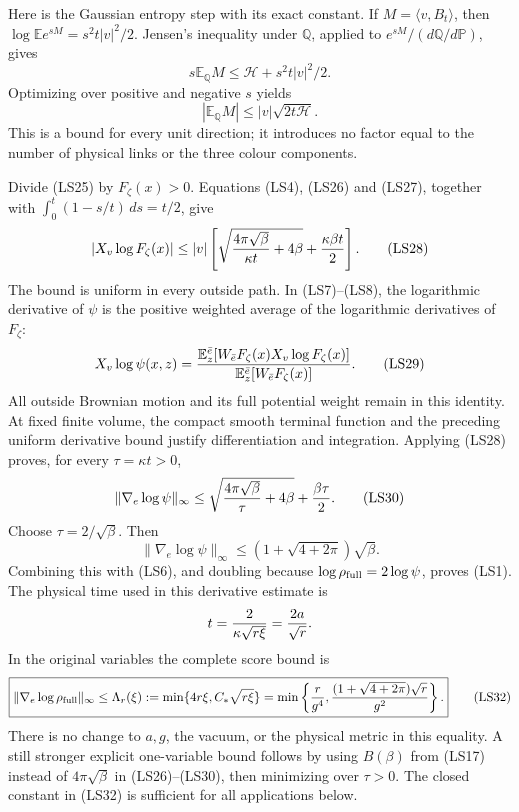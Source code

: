 \documentclass[11pt]{article}
\begin{document}
Here is the Gaussian entropy step with its exact constant.
If \(M=\langle v,B_t\rangle\), then
\(\log\mathbb E e^{sM}=s^2t|v|^2/2\). Jensen's inequality
under \(\mathbb Q\), applied to
\(e^{sM}/(d\mathbb Q/d\mathbb P)\), gives
\[
 s\mathbb E_{\mathbb Q}M
                  \le\mathcal H+s^2t|v|^2/2.
 \]
Optimizing over positive and negative \(s\) yields
\[
 |\mathbb E_{\mathbb Q}M|
                         \le |v|\sqrt{2t\mathcal H}.
 \tag{LS27}
\]
This is a bound for every unit direction; it introduces no factor
equal to the number of physical links or the three colour
components.

Divide (LS25) by \(F_\zeta(x)>0\). Equations (LS4), (LS26)
and (LS27), together with
\(\int_0^t(1-s/t)\,ds=t/2\), give
\[
 |X_v\log F_\zeta(x)|
 \le |v|\left[
 \sqrt{{4\pi\sqrt\beta\over\kappa t}+4\beta}
                                  +{\kappa\beta t\over2}\right].
 \tag{LS28}
\]
The bound is uniform in every outside path. In (LS7)–(LS8),
the logarithmic derivative of \(\psi\) is the positive weighted
average of the logarithmic derivatives of \(F_\zeta\):
\[
 X_v\log\psi(x,z)
 ={\mathbb E_z^{\bar e}
       [W_{\bar e}F_\zeta(x)X_v\log F_\zeta(x)]
        \over
        \mathbb E_z^{\bar e}[W_{\bar e}F_\zeta(x)]}.
 \tag{LS29}
\]
All outside Brownian motion and its full potential weight remain
in this identity. At fixed finite volume, the compact smooth
terminal function and the preceding uniform derivative bound
justify differentiation and integration. Applying (LS28) proves,
for every \(\tau=\kappa t>0\),
\[
 \|\nabla_e\log\psi\|_\infty
 \le\sqrt{{4\pi\sqrt\beta\over\tau}+4\beta}+{\beta\tau\over2}.
 \tag{LS30}
\]
Choose \(\tau=2/\sqrt\beta\). Then
\[
 \boxed{\|\nabla_e\log\psi\|_\infty
       \le(1+\sqrt{4+2\pi})\sqrt\beta.}
 \tag{LS31}
\]
Combining this with (LS6), and doubling because
\(\log\rho_{\rm full}=2\log\psi\), proves (LS1).
The physical time used in this derivative estimate is
\[
 t={2\over\kappa\sqrt{r\xi}}={2a\over\sqrt r}.
 \]
In the original variables the complete score bound is
\[
 \boxed{\|\nabla_e\log\rho_{\rm full}\|_\infty
 \le\Lambda_r(\xi):=\min\{4r\xi,C_*\sqrt{r\xi}\}
 =\min\left\{{r\over g^4},
                  {(1+\sqrt{4+2\pi})\sqrt r\over g^2}\right\}.}
 \tag{LS32}
\]
There is no change to \(a,g\), the vacuum, or the physical
metric in this equality. A still stronger explicit one-variable
bound follows by using \(B(\beta)\) from (LS17) instead of
\(4\pi\sqrt\beta\) in (LS26)–(LS30), then minimizing over
\(\tau>0\). The closed constant in (LS32) is sufficient for all
applications below.
\end{document}
